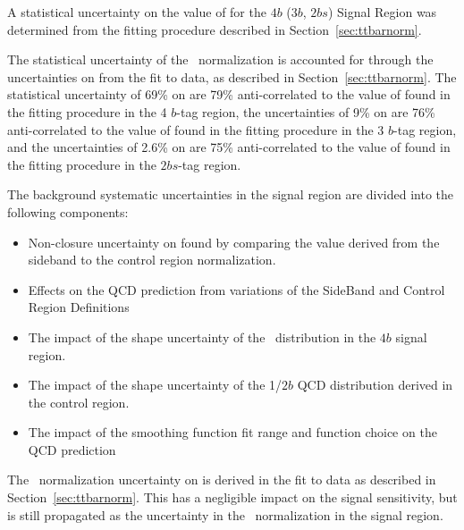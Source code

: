 A statistical uncertainty on the value of \muqcd for the $4b$ ($3b$, $2bs$) Signal Region was determined from the fitting procedure described in Section~\ref{sec:ttbarnorm}. 

The statistical uncertainty of the \ttbar\ normalization is accounted for through the uncertainties on \alphatt from the fit to data, as described in Section~\ref{sec:ttbarnorm}. The statistical uncertainty of 69\% on \alphatt are 79\% anti-correlated to the value of \muqcd found in the fitting procedure in the 4 $b$-tag region, the uncertainties of 9\% on \alphatt are 76\% anti-correlated to the value of \muqcd found in the fitting procedure in the 3 $b$-tag region, and the uncertainties of 2.6\% on \alphatt are 75\% anti-correlated to the value of \muqcd found in the fitting procedure in the $2bs$-tag region.

The background systematic uncertainties in the signal region are divided into the following components:
\begin{itemize}
 \item Non-closure uncertainty on \muqcd found by comparing the value derived from the sideband to the control region normalization.
 \item Effects on the QCD prediction from variations of the SideBand and Control Region Definitions
 \item The impact of the shape uncertainty of the \ttbar\ distribution in the $4b$ signal region.
 \item The impact of the shape uncertainty of the 1/$2b$ QCD distribution derived in the control region.
 \item The impact of the smoothing function fit range and function choice on the QCD prediction
\end{itemize}

The \ttbar\ normalization uncertainty on \alphatt is derived in the fit to data as described in Section~\ref{sec:ttbarnorm}. This has a negligible impact on the signal sensitivity, but is still propagated as the uncertainty in the \ttbar\ normalization in the signal region.

